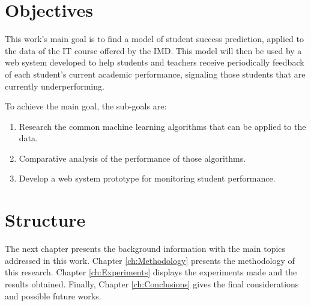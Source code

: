 \section{Objectives}

This work's main goal is to find a model of student success prediction, applied to the data of the IT course offered by the IMD. This model will then be used by a web system developed to help students and teachers receive periodically feedback of each student's current academic performance, signaling those students that are currently underperforming.

To achieve the main goal, the sub-goals are:

\begin{enumerate}
    \item Research the common machine learning algorithms that can be applied to the data.
    \item Comparative analysis of the performance of those algorithms.
    \item Develop a web system prototype for monitoring student performance.
\end{enumerate}

\section{Structure}

The next chapter presents the background information with the main topics addressed in this work. Chapter \ref{ch:Methodology} presents the methodology of this research. Chapter \ref{ch:Experiments} displays the experiments made and the results obtained. Finally, Chapter \ref{ch:Conclusions} gives the final considerations and possible future works.